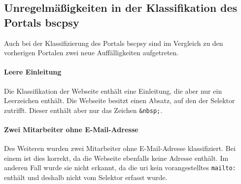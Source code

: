 \subsection{Unregelmäßigkeiten in der Klassifikation des Portals \acrshort{bscpsy}}
    Auch bei der Klassifizierung des Portals \gls{bscpsy}
    sind im Vergleich zu den vorherigen Portalen zwei neue
    Auffälligkeiten aufgetreten.

    \paragraph{Leere Einleitung}
        Die Klassifikation der Webseite enthält eine Einleitung,
        die aber nur ein Leerzeichen enthält.
        Die Webseite besitzt einen Absatz,
        auf den der Selektor zutrifft.
        Dieser enthält aber nur das Zeichen \texttt{\&nbsp;}.

    \paragraph{Zwei Mitarbeiter ohne E-Mail-Adresse}
        Des Weiteren wurden zwei Mitarbeiter ohne E-Mail-Adresse klassifiziert.
        Bei einem ist dies korrekt, da die Webseite ebenfalls keine Adresse enthält.
        Im anderen Fall wurde sie nicht erkannt,
        da die \gls{uri} kein vorangestelltes \texttt{mailto:} enthält
        und deshalb nicht vom Selektor erfasst wurde.
        